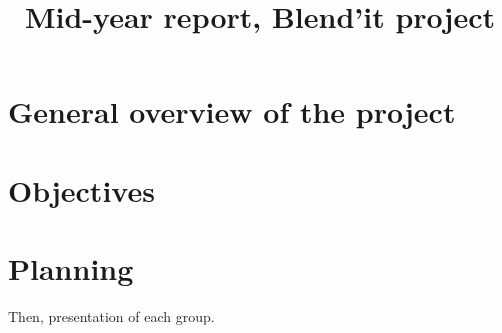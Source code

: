 \documentclass[a4paper,10pt]{article}
\title{Mid-year report, Blend'it project}
\author{}
\begin{document}
\maketitle

\tableofcontents

\section{General overview of the project}
\section{Objectives}
\section{Planning}

Then, presentation of each group.




\begingroup




\endgroup
\end{document}
